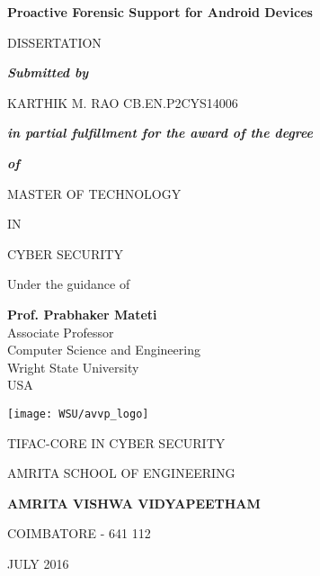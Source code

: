 \begin{center}
  \Large
\textbf{Proactive Forensic Support for Android Devices}

\vspace*{22pt}
\normalsize
DISSERTATION 

\vspace*{12pt}
\textbf{\textit{Submitted by}}

\vspace*{12pt}
\begin{flushleft}
 \hspace*{100pt}
 \large
KARTHIK M. RAO
 \hspace*{2pt}
 \large
CB.EN.P2CYS14006
\end{flushleft}

\vspace*{12pt}
\normalsize
\textit{\textbf{in partial fulfillment for the award of the degree}}

\textbf{\textit{of}}


\vspace*{22pt}
MASTER OF TECHNOLOGY

IN

CYBER SECURITY

\vspace*{22pt}
Under the guidance of

\vspace*{12pt}
\textbf{Prof. Prabhaker Mateti}\\Associate Professor\\ Computer Science and Engineering\\Wright State University\\USA

\vspace*{22pt}
\texttt{[image: WSU/avvp\_logo]}

\vspace{25pt}
\normalsize
TIFAC-CORE IN CYBER SECURITY

\vspace*{5pt}
AMRITA SCHOOL OF ENGINEERING

\vspace*{5pt}
\large
\textbf{AMRITA VISHWA VIDYAPEETHAM}

\vspace*{5pt}
\normalsize
COIMBATORE - 641 112

\vspace*{5pt}
JULY 2016
\end{center}
  

